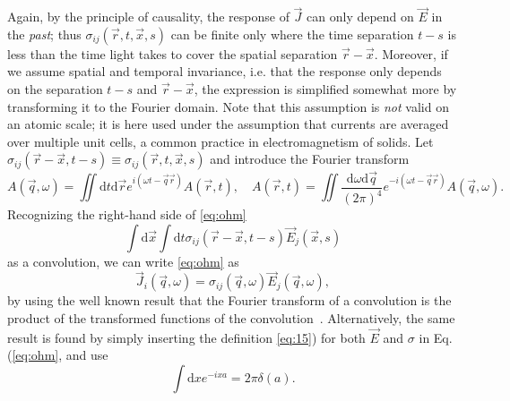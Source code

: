 Again, by the principle of causality, the response of $\vec{J}$ can only depend on $\vec{E}$ in the \emph{past};
thus $\sigma_{ij}(\vec{r}, t, \vec{x}, s)$ can be finite only where the time separation $t-s$ is less than the time light takes to cover the spatial separation $\vec{r} - \vec{x}$.
Moreover, if we assume spatial and temporal invariance, i.e. that the response only depends on the separation $t-s$ and $\vec{r} - \vec{x}$, the expression is simplified somewhat more by transforming it to the Fourier domain.
Note that this assumption is \emph{not} valid on an atomic scale;
it is here used under the assumption that currents are averaged over multiple unit cells, a common practice in electromagnetism of solids.
Let $\sigma_{ij}(\vec{r} - \vec{x}, t-s) \equiv \sigma_{ij}(\vec{r}, t, \vec{x}, s)$ and introduce the Fourier transform
\begin{equation}
  \label{eq:15}
  A(\vec{q}, \omega ) =
  \iint \mathrm{d}t \mathrm{d} \vec{r}
  e^{i(\omega  t - \vec{q} \vec{r} )}
  A(\vec{r}, t),
  \quad
  A(\vec{r}, t) =
  \iint 
  \frac{\mathrm{d}\omega  \mathrm{d} \vec{q}}{(2\pi )^4}
  e^{-i(\omega  t - \vec{q} \vec{r} )}
  A(\vec{q}, \omega).
\end{equation}
Recognizing the right-hand side of \cref{eq:ohm}
\begin{equation}
  \int \mathrm{d} \vec{x} \int \mathrm{d} t
  \sigma _{ij} (\vec{r}-\vec{x}, t-s ) \vec{E}_{j}(\vec{x}, s)
\end{equation}
as a convolution, we can write \cref{eq:ohm} as
\begin{equation}
\label{eq:ohm-fourier}
  \vec{J}_i(\vec{q}, \omega) =
  \sigma_{ij}(\vec{q}, \omega)
  \vec{E}_j(\vec{q}, \omega),
\end{equation}
by using the well known result that the Fourier transform of a convolution is the product of the transformed functions of the convolution~\cite{rottmannMatematiskFormelsamling1995}.
Alternatively, the same result is found by simply inserting the definition \cref{eq:15}) for both $\vec{E}$ and $\sigma $ in Eq. (\ref{eq:ohm}, and use
\[
\int \mathrm{d} x e^{-i x a} = 2\pi \delta (a).
  \]

